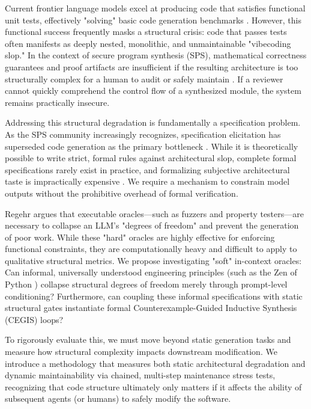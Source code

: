 \documentclass[11pt]{article}
\begin{document}
Current frontier language models excel at producing code that satisfies functional unit tests, effectively "solving" basic code generation benchmarks \cite{Chen2021HumanEval}. However, this functional success frequently masks a structural crisis: code that passes tests often manifests as deeply nested, monolithic, and unmaintainable "vibecoding slop." In the context of secure program synthesis (SPS), mathematical correctness guarantees and proof artifacts are insufficient if the resulting architecture is too structurally complex for a human to audit or safely maintain \cite{QuinnHippel2026Proofs}. If a reviewer cannot quickly comprehend the control flow of a synthesized module, the system remains practically insecure.

Addressing this structural degradation is fundamentally a specification problem. As the SPS community increasingly recognizes, specification elicitation has superseded code generation as the primary bottleneck \cite{VonHippel2026SPS}. While it is theoretically possible to write strict, formal rules against architectural slop, complete formal specifications rarely exist in practice, and formalizing subjective architectural taste is impractically expensive \cite{Dodds2025Specs}. We require a mechanism to constrain model outputs without the prohibitive overhead of formal verification.

Regehr \cite{Regehr2026ZeroDOF} argues that executable oracles---such as fuzzers and property testers---are necessary to collapse an LLM's "degrees of freedom" and prevent the generation of poor work. While these "hard" oracles are highly effective for enforcing functional constraints, they are computationally heavy and difficult to apply to qualitative structural metrics. We propose investigating "soft" in-context oracles: Can informal, universally understood engineering principles (such as the Zen of Python \cite{Peters2004Zen}) collapse structural degrees of freedom merely through prompt-level conditioning? Furthermore, can coupling these informal specifications with static structural gates instantiate formal Counterexample-Guided Inductive Synthesis (CEGIS) loops?

To rigorously evaluate this, we must move beyond static generation tasks and measure how structural complexity impacts downstream modification. We introduce a methodology that measures both static architectural degradation and dynamic maintainability via chained, multi-step maintenance stress tests, recognizing that code structure ultimately only matters if it affects the ability of subsequent agents (or humans) to safely modify the software.
\end{document}
